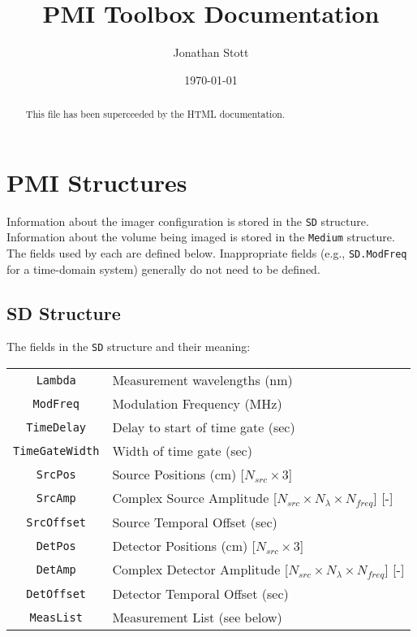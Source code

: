 \documentclass[12pt]{article}
\newcommand{\pmifield}[1]{{\tt #1}}
\begin{document}
\title{PMI Toolbox Documentation}
\author{Jonathan Stott}
\date{\today}

\maketitle

\begin{abstract}
This file has been superceeded by the HTML documentation.
\end{abstract}

\section{PMI Structures}

Information about the imager configuration is stored in the \pmifield{SD}
structure.  Information about the volume being imaged is stored in the
\pmifield{Medium} structure.  The fields used by each are defined below.
Inappropriate fields (e.g., \pmifield{SD.ModFreq} for a time-domain
system) generally do not need to be defined.

\subsection{SD Structure}

The fields in the \pmifield{SD} structure and their meaning:
\begin{center}
\begin{tabular}{|c|l|}
\hline
\pmifield{Lambda}        & Measurement wavelengths (nm) \\[2pt]
\pmifield{ModFreq}       & Modulation Frequency (MHz) \\[2pt]
\pmifield{TimeDelay}     & Delay to start of time gate (sec) \\[2pt]
\pmifield{TimeGateWidth} & Width of time gate (sec) \\[2pt]
\hline
\pmifield{SrcPos}        & Source Positions (cm) [$N_{src}\times3$] \\[2pt]
\pmifield{SrcAmp}        & Complex Source Amplitude 
				[$N_{src}\times N_{\lambda}\times N_{freq}$] 
				[-] \\[2pt]
\pmifield{SrcOffset}     & Source Temporal Offset (sec) \\[2pt]
\hline
\pmifield{DetPos}        & Detector Positions (cm) [$N_{src}\times3$] \\[2pt]
\pmifield{DetAmp}        & Complex Detector Amplitude 
				[$N_{src}\times N_{\lambda}\times N_{freq}$] 
				[-] \\[2pt]
\pmifield{DetOffset}     & Detector Temporal Offset (sec) \\[2pt]
\hline
\pmifield{MeasList}      & Measurement List (see below) \\[2pt]
\hline
\end{tabular}
\end{center}
\end{document}
